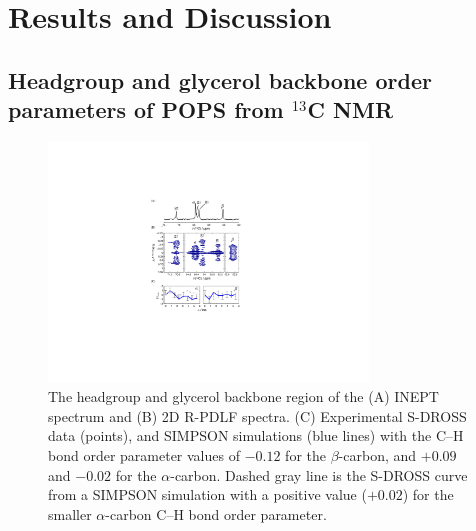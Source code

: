 \documentclass[aps,prl,superscriptaddress,twocolumn]{revtex4}
\begin{document}
\section{Results and Discussion}

\subsection{Headgroup and glycerol backbone order parameters of POPS from $^{13}$C NMR}

\begin{figure}[!tb]
  \centering
  \includegraphics[width=8.5cm]{../Figs/fig1_POPS.pdf}
  \caption{\label{PShgSIGNSsimpson}
    The headgroup and glycerol backbone region of the (A) INEPT spectrum and
    (B) 2D R-PDLF spectra.
    (C) Experimental S-DROSS data (points), and SIMPSON simulations (blue lines) with
    the C--H bond order parameter values of $-0.12$ for the $\beta$-carbon, and $+0.09$ and $-0.02$
    for the $\alpha$-carbon.
    Dashed gray line is the S-DROSS curve from a SIMPSON simulation with a positive value ($+0.02$) 
    for the smaller $\alpha$-carbon C--H bond order parameter.
  }
\end{figure}
\end{document}
